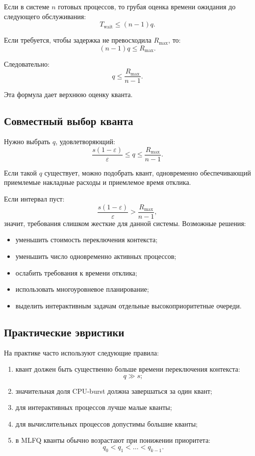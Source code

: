 \documentclass[12pt,a4paper]{article}
\begin{document}
Если в системе $n$ готовых процессов, то грубая оценка времени ожидания до следующего обслуживания:
\[
T_{\text{wait}} \leq (n-1)q.
\]

Если требуется, чтобы задержка не превосходила $R_{\max}$, то:
\[
(n-1)q \leq R_{\max}.
\]

Следовательно:
\[
q \leq \frac{R_{\max}}{n-1}.
\]

Эта формула дает верхнюю оценку кванта.

\subsection{Совместный выбор кванта}

Нужно выбрать $q$, удовлетворяющий:
\[
\frac{s(1-\varepsilon)}{\varepsilon} \leq q \leq \frac{R_{\max}}{n-1}.
\]

Если такой $q$ существует, можно подобрать квант, одновременно обеспечивающий приемлемые накладные расходы и приемлемое время отклика.

Если интервал пуст:
\[
\frac{s(1-\varepsilon)}{\varepsilon} > \frac{R_{\max}}{n-1},
\]
значит, требования слишком жесткие для данной системы. Возможные решения:
\begin{itemize}
    \item уменьшить стоимость переключения контекста;
    \item уменьшить число одновременно активных процессов;
    \item ослабить требования к времени отклика;
    \item использовать многоуровневое планирование;
    \item выделить интерактивным задачам отдельные высокоприоритетные очереди.
\end{itemize}

\subsection{Практические эвристики}

На практике часто используют следующие правила:
\begin{enumerate}
    \item квант должен быть существенно больше времени переключения контекста:
    \[
    q \gg s;
    \]

    \item значительная доля CPU-burst должна завершаться за один квант;

    \item для интерактивных процессов лучше малые кванты;

    \item для вычислительных процессов допустимы большие кванты;

    \item в MLFQ кванты обычно возрастают при понижении приоритета:
    \[
    q_0 < q_1 < \ldots < q_{k-1}.
    \]
\end{enumerate}
\end{document}
